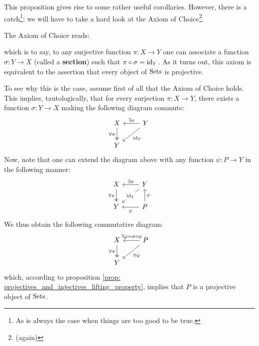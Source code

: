             This proposition gives rise to some rather useful corollaries. However, there is a catch\footnote{As is always the case when things are too good to be true.}: we will have to take a hard look at the Axiom of Choice\footnote{(again)}.
            \begin{remark} \label{remark: all_sets_are_projective}
                The Axiom of Choice reads:
                    \begin{center}
                    \end{center}
                which is to say, to any surjective function $\pi: X \to Y$ one can associate a function $\sigma: Y \to X$ (called a \textbf{section}) such that $\pi \circ \sigma = \mathrm{id}_Y$. As it turns out, this axiom is equivalent to the assertion that every object of $\mathrm{Sets}$ is projective. 
                
                To see why this is the case, assume first of all that the Axiom of Choice holds. This implies, tautologically, that for every surjection $\pi: X \to Y$, there exists a function $\sigma: Y \to X$ making the following diagram commute:
                    $$
                        \begin{tikzcd}
                        	X & Y \\
                        	Y
                        	\arrow["{\forall \pi}"', two heads, from=1-1, to=2-1]
                        	\arrow["{\id_Y}", from=1-2, to=2-1]
                        	\arrow["{\exists \sigma}"', from=1-2, to=1-1]
                        \end{tikzcd}
                    $$
                Now, note that one can extend the diagram above with any function $\psi: P \to Y$ in the following manner:
                    $$
                        \begin{tikzcd}
                        	X & Y \\
                        	Y & P
                        	\arrow["{\forall \pi}"', two heads, from=1-1, to=2-1]
                        	\arrow["{\id_Y}"{description}, from=1-2, to=2-1]
                        	\arrow["{\exists \sigma}"', from=1-2, to=1-1]
                        	\arrow["\psi"', from=2-2, to=1-2]
                        	\arrow["\psi", from=2-2, to=2-1]
                        \end{tikzcd}
                    $$
                We thus obtain the following commutative diagram:
                    $$
                        \begin{tikzcd}
                        	X & P \\
                        	Y
                        	\arrow["{\forall \pi}"', two heads, from=1-1, to=2-1]
                        	\arrow["{\forall \psi}", from=1-2, to=2-1]
                        	\arrow["{\exists \varphi = \sigma \circ \psi}"', from=1-2, to=1-1]
                        \end{tikzcd}
                    $$
                which, according to proposition \ref{prop: projectives_and_injectives_lifting_property}, implies that $P$ is a projective object of $\mathrm{Sets}$.
                

\end{remark}
